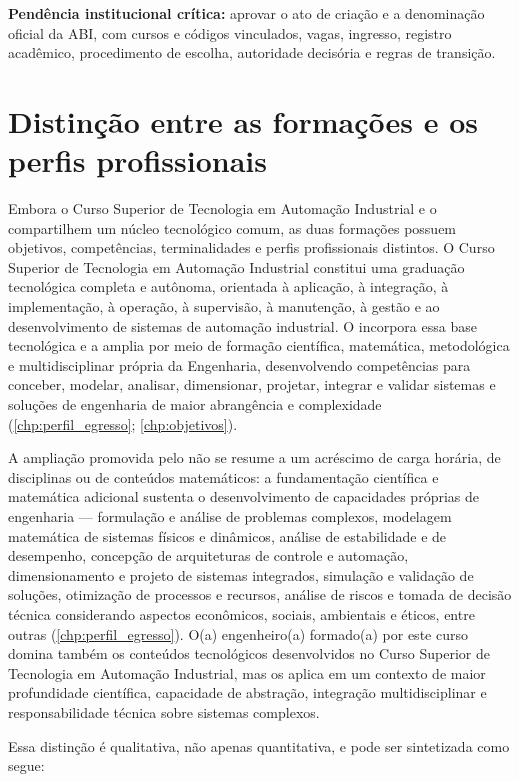 \textbf{Pendência institucional crítica:} aprovar o ato de criação e a denominação oficial da ABI, com cursos e códigos vinculados, vagas, ingresso, registro acadêmico, procedimento de escolha, autoridade decisória e regras de transição.

\section{Distinção entre as formações e os perfis profissionais}
\label{sec:distincao_perfis}

Embora o Curso Superior de Tecnologia em Automação Industrial e o \ppccurso compartilhem um núcleo tecnológico comum, as duas formações possuem objetivos, competências, terminalidades e perfis profissionais distintos. O Curso Superior de Tecnologia em Automação Industrial constitui uma graduação tecnológica completa e autônoma, orientada à aplicação, à integração, à implementação, à operação, à supervisão, à manutenção, à gestão e ao desenvolvimento de sistemas de automação industrial. O \ppccurso incorpora essa base tecnológica e a amplia por meio de formação científica, matemática, metodológica e multidisciplinar própria da Engenharia, desenvolvendo competências para conceber, modelar, analisar, dimensionar, projetar, integrar e validar sistemas e soluções de engenharia de maior abrangência e complexidade (\autoref{chp:perfil_egresso}; \autoref{chp:objetivos}).

A ampliação promovida pelo \ppccurso não se resume a um acréscimo de carga horária, de disciplinas ou de conteúdos matemáticos: a fundamentação científica e matemática adicional sustenta o desenvolvimento de capacidades próprias de engenharia — formulação e análise de problemas complexos, modelagem matemática de sistemas físicos e dinâmicos, análise de estabilidade e de desempenho, concepção de arquiteturas de controle e automação, dimensionamento e projeto de sistemas integrados, simulação e validação de soluções, otimização de processos e recursos, análise de riscos e tomada de decisão técnica considerando aspectos econômicos, sociais, ambientais e éticos, entre outras (\autoref{chp:perfil_egresso}). O(a) engenheiro(a) formado(a) por este curso domina também os conteúdos tecnológicos desenvolvidos no Curso Superior de Tecnologia em Automação Industrial, mas os aplica em um contexto de maior profundidade científica, capacidade de abstração, integração multidisciplinar e responsabilidade técnica sobre sistemas complexos.

Essa distinção é qualitativa, não apenas quantitativa, e pode ser sintetizada como segue:

